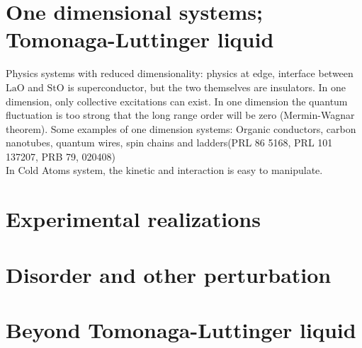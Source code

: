 \documentclass{article}
\begin{document}
\section{One dimensional systems; Tomonaga-Luttinger liquid}
Physics systems with reduced dimensionality: physics at edge, interface between $\mathrm{LaO}$ and $\mathrm{StO}$ is superconductor, but the two themselves are insulators. In one dimension, only collective excitations can exist. In one dimension the quantum fluctuation is too strong that the long range order will be zero (Mermin-Wagnar theorem). 
Some examples of one dimension systems: Organic conductors, carbon nanotubes, quantum wires, spin chains and ladders(PRL 86 5168, PRL 101 137207, PRB 79, 020408)\\
In Cold Atoms system, the kinetic and interaction is easy to manipulate.

\section{Experimental realizations}

\section{Disorder and other perturbation}

\section{Beyond Tomonaga-Luttinger liquid}
\end{document}
